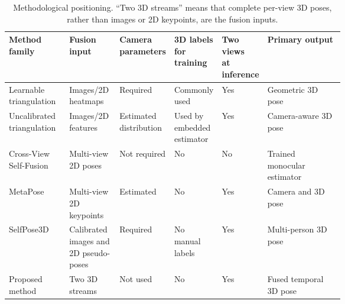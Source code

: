 \begin{table}[t]
\centering
\caption{Methodological positioning. ``Two 3D streams'' means that complete
per-view 3D poses, rather than images or 2D keypoints, are the fusion inputs.}
\label{tab:positioning}
\scriptsize
\setlength{\tabcolsep}{3pt}
\begin{tabularx}{\linewidth}{p{0.18\linewidth} p{0.15\linewidth}
  >{\centering\arraybackslash}p{0.11\linewidth}
  >{\centering\arraybackslash}p{0.11\linewidth}
  >{\centering\arraybackslash}p{0.11\linewidth} X}
\toprule
Method family & Fusion input & \makecell{Camera\\parameters} &
\makecell{3D labels\\for training} & \makecell{Two views\\at inference} & Primary output \\
\midrule
Learnable triangulation \citep{Iskakov2019Learnable} & Images/2D heatmaps & Required & Commonly used & Yes & Geometric 3D pose \\
Uncalibrated triangulation \citep{Jiang2023Probabilistic} & Images/2D features & Estimated distribution & Used by embedded estimator & Yes & Camera-aware 3D pose \\
Cross-View Self-Fusion \citep{Kim2022CrossViewSelfFusion} & Multi-view 2D poses & Not required & No & No & Trained monocular estimator \\
MetaPose \citep{Usman2022MetaPose} & Multi-view 2D keypoints & Estimated & No & Yes & Camera and 3D pose \\
SelfPose3D \citep{Srivastav2024SelfPose3D} & Calibrated images and 2D pseudo-poses & Required & No manual labels & Yes & Multi-person 3D pose \\
Proposed method & Two 3D streams & Not used & No & Yes & Fused temporal 3D pose \\
\bottomrule
\end{tabularx}
\end{table}
